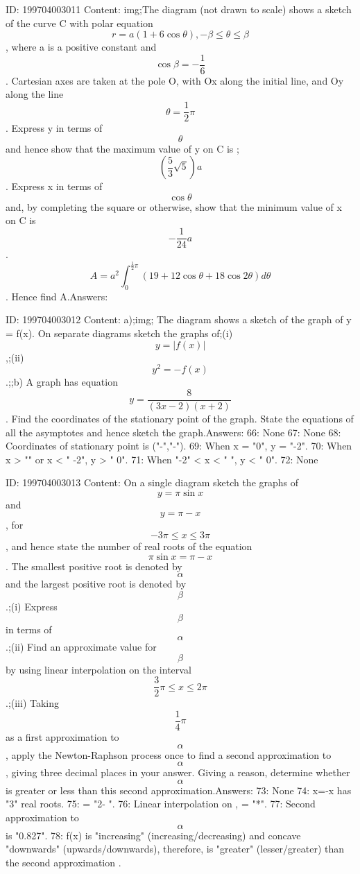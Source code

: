 \documentclass{article}
\begin{document}
ID: 199704003011
Content:
img;The diagram (not drawn to scale) shows a sketch of the curve C with polar equation \[r = a(1 + 6\cos \theta), -\beta \leq \theta \leq \beta\], where a is a positive constant and \[\cos \beta = - \frac {1}{6}\]. Cartesian axes are taken at the pole O, with Ox along the initial line, and Oy along the line \[\theta = \frac {1}{2} \pi\]. Express y in terms of \[\theta\] and hence show that the maximum value of y on C is ;\[(\frac {5}{3} \sqrt{5})a\]. Express x in terms of \[\cos \theta\] and, by completing the square or otherwise, show that the minimum value of x on C is \[- \frac {1}{24}a\]. \[A = a^{2}\int_{0}^{\frac {1}{2} \pi} (19 + 12\cos \theta + 18 \cos 2\theta)d \theta\]. Hence find A.Answers:

ID: 199704003012
Content:
a);img; The diagram shows a sketch of the graph of y = f(x). On separate diagrams sketch the graphs of;(i) \[y = |f(x)|\],;(ii) \[y^{2} = -f(x)\].;;b) A graph has equation \[y = \frac {8}{(3x - 2)(x + 2)}\]. Find the coordinates of the stationary point of the graph. State the equations of all the asymptotes and hence sketch the graph.Answers:
66: None
67: None
68: Coordinates of stationary point is ("-","-").
69: When x = "0", y = "-2".
70: When x > "" or x < " -2", y > " 0".
71: When "-2" < x < " ", y < " 0".
72: None

ID: 199704003013
Content:
On a single diagram sketch the graphs of \[y = \pi \sin x\] and \[y = \pi - x\], for \[-3\pi \leq x\leq 3\pi\], and hence state the number of real roots of the equation \[\pi \sin x = \pi - x\]. The smallest positive root is denoted by \[\alpha\] and the largest positive root is denoted by \[\beta\].;(i) Express \[\beta\] in terms of \[\alpha\].;(ii) Find an approximate value for \[\beta\] by using linear interpolation on the interval \[\frac {3}{2}\pi \leq x \leq 2\pi\].;(iii) Taking \[\frac {1}{4} \pi\] as a first approximation to \[\alpha\], apply the Newton-Raphson process once to find a second approximation to  \[\alpha\], giving three decimal places in your answer. Giving a reason, determine whether \[\alpha\] is greater or less than this second approximation.Answers:
73: None
74: \pi \sin x=\pi -x has "3" real roots.
75: \beta = "2\pi - \alpha".
76: Linear interpolation on , \space \beta = "*\pi".
77: Second approximation to  \[\alpha\] is "0.827".
78: f(x) is "increasing" (increasing/decreasing) and concave "downwards" (upwards/downwards), therefore, \alpha is "greater" (lesser/greater) than the second approximation .
\end{document}
